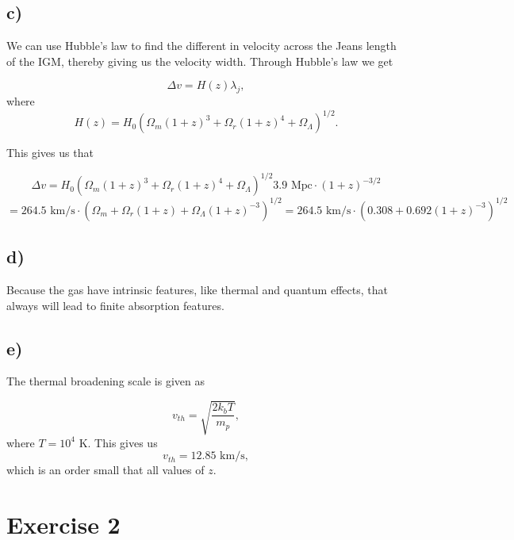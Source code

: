 \documentclass[a4paper,norsk, 10pt]{article}
\begin{document}
\subsection{c)}
We can use Hubble's law to find the different in velocity across the Jeans length of the IGM, thereby giving us the velocity width. Through Hubble's law we get

\begin{equation}
\Delta v = H(z) \lambda_j,
\end{equation}
where
\begin{equation}
H(z) = H_0 (\Omega_m(1+z)^3 + \Omega_r(1+z)^4 + \Omega_{\Lambda})^{1/2}.
\end{equation}

This gives us that

\begin{equation}
\Delta v = H_0 (\Omega_m(1+z)^3 + \Omega_r(1+z)^4 + \Omega_{\Lambda})^{1/2}3.9\text{ Mpc}\cdot(1+z)^{-3/2} 
\end{equation}
\begin{equation}
= 264.5 \text{ km/s}\cdot (\Omega_m + \Omega_r(1+z) + \Omega_{\Lambda}(1+z)^{-3})^{1/2} = 264.5 \text{ km/s}\cdot (0.308 +  0.692(1+z)^{-3})^{1/2}
\end{equation}


\subsection{d)}

Because the gas have intrinsic features, like thermal and quantum effects, that always will lead to finite absorption features.

\subsection{e)}

The thermal broadening scale is given as

\begin{equation}
 v_{th} = \sqrt{\dfrac{2k_b T}{m_p}},
 \end{equation} 
where $T = 10^4$ K. This gives us
\begin{equation}
v_{th} = 12.85 \text{ km/s},
\end{equation}
which is an order small that all values of $z$.

\section{Exercise 2}
\end{document}
